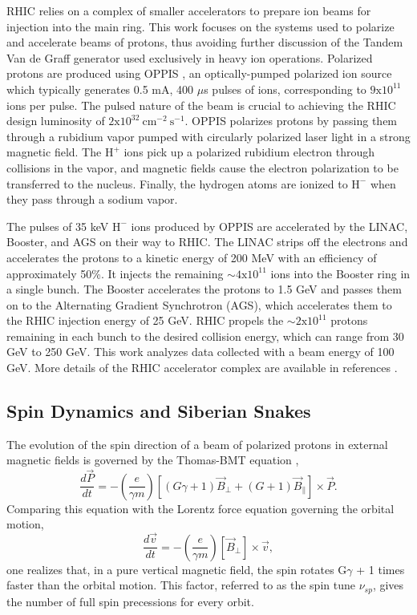RHIC relies on a complex of smaller accelerators to prepare ion beams for injection into the main ring.  This work focuses on the systems used to polarize and accelerate beams of protons, thus avoiding further discussion of the Tandem Van de Graff generator used exclusively in heavy ion operations.  Polarized protons are produced using OPPIS \cite{Zelenski:2002gb, Zelenski:2008zza}, an optically-pumped polarized ion source which typically generates 0.5 mA, 400 $\mu$s pulses of ions, corresponding to $\mathrm{9x10^{11}}$ ions per pulse.  The pulsed nature of the beam is crucial to achieving the RHIC design luminosity of $\mathrm{2x10^{32}~cm^{-2}~s^{-1}}$. OPPIS polarizes protons by passing them through a rubidium vapor pumped with circularly polarized laser light in a strong magnetic field.  The $\mathrm{H^+}$ ions pick up a polarized rubidium electron through collisions in the vapor, and magnetic fields cause the electron polarization to be transferred to the nucleus.  Finally, the hydrogen atoms are ionized to $\mathrm{H^-}$ when they pass through a sodium vapor.

The pulses of 35 keV $\mathrm{H^-}$ ions produced by OPPIS are accelerated by the LINAC, Booster, and AGS on their way to RHIC.  The LINAC strips off the electrons and accelerates the protons to a kinetic energy of 200 MeV with an efficiency of approximately 50\%.  It injects the remaining $\sim \mathrm{4x10^{11}}$ ions into the Booster ring in a single bunch.  The Booster
accelerates the protons to 1.5 GeV and passes them on to the Alternating Gradient Synchrotron (AGS), which accelerates them to the RHIC injection energy of 25 GeV.  RHIC propels the $\sim \mathrm{2x10^{11}}$ protons remaining in each bunch to the desired collision energy, which can range from 30 GeV to 250 GeV.  This work analyzes data collected with a beam energy of 100 GeV.  More details of the RHIC accelerator complex are available in references \cite{Harrison:2003sb, Hahn:2003sc, Alekseev:2003sk}.

\subsection{Spin Dynamics and Siberian Snakes}

The evolution of the spin direction of a beam of polarized protons in external magnetic fields is governed by the Thomas-BMT equation \cite{Thomas:1927yu, Bargmann:1959gz},
%
\begin{equation}
  \frac{d\vec{P}}{dt} = -\left(\frac{e}{\gamma m}\right)[(G\gamma + 1) \vec{B}_{\perp} + (G + 1) \vec{B}_{\parallel}] \times \vec{P}.
\end{equation}
%
Comparing this equation with the Lorentz force equation governing the orbital motion,
%
\begin{equation}
  \frac{d\vec{v}}{dt} = -\left(\frac{e}{\gamma m}\right)[\vec{B}_{\perp}] \times \vec{v},
\end{equation}
%
one realizes that, in a pure vertical magnetic field, the spin rotates G$\gamma$ + 1 times faster than the orbital motion. This factor, referred to as the spin tune $\nu_{sp}$, gives the number of full spin precessions for every orbit.

